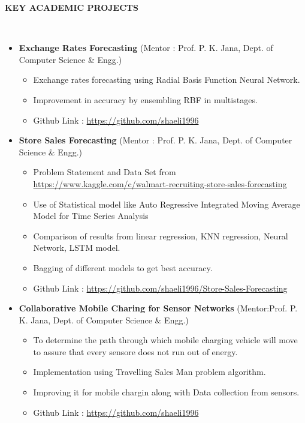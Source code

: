 \documentclass[a4paper,10pt]{article}
\newcommand{\isep}{-2 pt}
\newcommand{\lsep}{-0.5cm}
\newcommand{\resheading}[1]{{\small \colorbox{mygrey}{\begin{minipage}{0.975\textwidth}{\textbf{#1 \vphantom{p\^{E}}}}\end{minipage}}}}
\begin{document}
\resheading{\textbf{KEY ACADEMIC PROJECTS} }\\[\lsep]
\begin{itemize}
\item \textbf{Exchange Rates Forecasting} (Mentor : Prof. P. K. Jana, Dept. of Computer Science 
\& Engg.)\\[-0.6cm]
	\begin{itemize}\itemsep \isep
	\item Exchange rates forecasting using Radial Basis Function Neural Network.
	\item Improvement in accuracy by ensembling RBF in multistages.
	\item Github Link : \url{https://github.com/shaeli1996}
	\end{itemize}
\item \textbf{Store Sales Forecasting} (Mentor : Prof. P. K. Jana, Dept. of Computer Science 
\& Engg.)\\[-0.6cm]
	\begin{itemize}\itemsep \isep
	\item Problem Statement and Data Set from \url{https://www.kaggle.com/c/walmart-recruiting-store-sales-forecasting}
	\item Use of Statistical model like Auto Regressive Integrated Moving Average Model for Time Series
	Analysis
	\item Comparison of results from linear regression, KNN regression, Neural Network, LSTM model.
	\item Bagging of different models to get best accuracy.
	\item Github Link : \url{https://github.com/shaeli1996/Store-Sales-Forecasting}
	\end{itemize}
\item \textbf{Collaborative Mobile Charing for Sensor Networks
} (Mentor:Prof. P. K. Jana, Dept. of Computer Science \& Engg.) \\[-0.6cm]
	\begin{itemize}\itemsep \isep
	\item To determine the path through which mobile charging vehicle will move to assure that every sensore does not run out of energy.
	\item Implementation using Travelling Sales Man problem algorithm.
	\item Improving it for mobile chargin along with Data collection from sensors.
	\item Github Link : \url{https://github.com/shaeli1996}
	\end{itemize}

\end{itemize}
\end{document}
